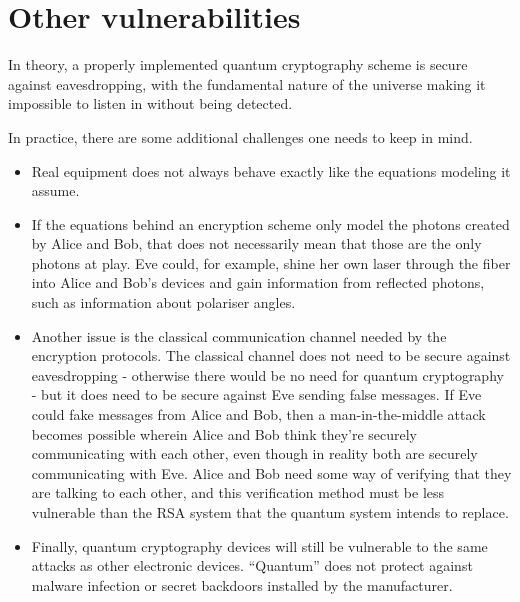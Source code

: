 \documentclass[12pt]{article}
\begin{document}
\section{Other vulnerabilities}

In theory, a properly implemented quantum cryptography scheme is secure against eavesdropping, with the fundamental nature of the universe making it impossible to listen in without being detected.

In practice, there are some additional challenges one needs to keep in mind.

\begin{itemize}
	\item Real equipment does not always behave exactly like the equations modeling it assume.
	\item If the equations behind an encryption scheme only model the photons created by Alice and Bob, that does not necessarily mean that those are the only photons at play.
	Eve could, for example, shine her own laser through the fiber into Alice and Bob's devices and gain information from reflected photons, such as information about polariser angles.
	\item Another issue is the classical communication channel needed by the encryption protocols.
	The classical channel does not need to be secure against eavesdropping - otherwise there would be no need for quantum cryptography - but it does need to be secure against Eve sending false messages.
	If Eve could fake messages from Alice and Bob, then a man-in-the-middle attack becomes possible wherein Alice and Bob think they're securely communicating with each other, even though in reality both are securely communicating with Eve.
	Alice and Bob need some way of verifying that they are talking to each other, and this verification method must be less vulnerable than the RSA system that the quantum system intends to replace.
	\item Finally, quantum cryptography devices will still be vulnerable to the same attacks as other electronic devices.
	``Quantum'' does not protect against malware infection or secret backdoors installed by the manufacturer.
\end{itemize}
\end{document}

